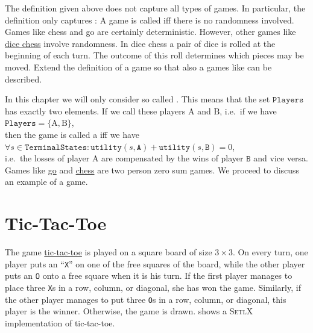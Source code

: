 \exercise
The definition given above does not capture all types of games.  In particular, the definition only captures 
:  A game is called  iff there is no randomness
involved.  Games like chess and go are certainly deterministic.  However, other games like 
\href{https://en.wikipedia.org/wiki/Dice_chess}{dice chess} involve randomness.  In dice chess a pair of dice is
rolled at the beginning of each turn.  The outcome of this roll determines which pieces may be moved.
Extend the definition of a
game so that also a games like  can be described. 
\eox

In this chapter we will only consider so called .  This means that the set $\mathtt{Players}$
has exactly two elements.  If we call these players $\mathrm{A}$ and $\mathrm{B}$, i.e.~if we have
\\[0.2cm]
\hspace*{1.3cm}
$\mathtt{Players} = \{ \mathrm{A}, \mathrm{B} \}$,
\\[0.2cm]
then the game is called a  iff we have
\\[0.2cm]
\hspace*{1.3cm}
$\forall s \in \mathtt{TerminalStates}:\mathtt{utility}(s, \mathtt{A}) + \mathtt{utility}(s, \mathtt{B}) = 0$,
\\[0.2cm]
i.e.~the losses of player $\mathrm{A}$ are compensated by the wins of player $\mathtt{B}$ and vice versa.
Games like \href{https://en.wikipedia.org/wiki/Go_(game)}{go} and 
\href{https://en.wikipedia.org/wiki/Chess}{chess} are two person zero sum games.
We proceed to discuss an example of a game.

\section{Tic-Tac-Toe}
The game \href{https://en.wikipedia.org/wiki/Tic-tac-toe}{tic-tac-toe} is played on a square board of size 
$3 \times 3$.  On every turn, one player puts an ``\texttt{X}'' on one of the free squares of the board, while
the other player puts an $\mathtt{O}$ onto a free square when it is his turn.  If the first player manages
to place three \texttt{X}s in a 
row, column, or diagonal, she has won the game.  Similarly, if the other player manages to put three \texttt{O}s in a
row, column, or diagonal, this player is the winner.  Otherwise, the game is drawn.
 shows a \textsc{SetlX} implementation of tic-tac-toe.


